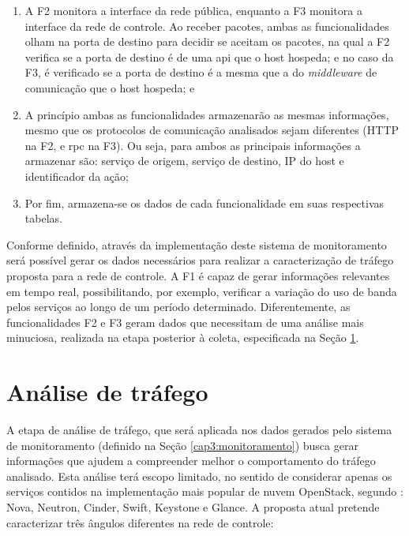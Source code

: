 \begin{enumerate}
\item A F2 monitora a interface da rede pública, enquanto a F3 monitora a interface da rede de controle.
%
Ao receber pacotes, ambas as funcionalidades olham na porta de destino para decidir se aceitam os pacotes, na qual a F2 verifica se a porta de destino é de uma \ac{api} que o host hospeda; e no caso da F3, é verificado se a porta de destino é a mesma que a do \textit{middleware} de comunicação que o host hospeda; e

\item A princípio ambas as funcionalidades armazenarão as mesmas informações, mesmo que os protocolos de comunicação analisados sejam diferentes (HTTP na F2, e \ac{rpc} na F3).
%
Ou seja, para ambos as principais informações a armazenar são: serviço de origem, serviço de destino, IP do host e identificador da ação;

\item Por fim, armazena-se os dados de cada funcionalidade em suas respectivas tabelas.
\end{enumerate}


Conforme definido, através da implementação deste sistema de monitoramento será possível gerar os dados necessários para realizar a caracterização de tráfego proposta para a rede de controle.
%
A F1 é capaz de gerar informações relevantes em tempo real, possibilitando, por exemplo, verificar a variação do uso de banda pelos serviços ao longo de um período determinado.
%
Diferentemente, as funcionalidades F2 e F3 geram dados que necessitam de uma análise mais minuciosa, realizada na etapa posterior à coleta, especificada na Seção \ref{cap3:analise}.


\section{Análise de tráfego}
\label{cap3:analise}

A etapa de análise de tráfego, que será aplicada nos dados gerados pelo sistema de monitoramento (definido na Seção \ref{cap3:monitoramento}) busca gerar informações que ajudem a compreender melhor o comportamento do tráfego analisado.
%
Esta análise terá escopo limitado, no sentido de considerar apenas os serviços contidos na implementação mais popular de nuvem OpenStack, segundo : Nova, Neutron, Cinder, Swift, Keystone e Glance.
%
A proposta atual pretende caracterizar três ângulos diferentes na rede de controle:

